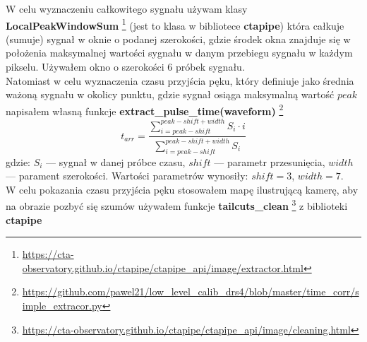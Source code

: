 \documentclass[a4paper,11pt,twoside]{article}
\begin{document}
W celu wyznaczeniu całkowitego sygnału używam klasy {\bf{LocalPeakWindowSum}} \footnote{\url{https://cta-observatory.github.io/ctapipe/ctapipe_api/image/extractor.html}} (jest to klasa w bibliotece {\bf{ctapipe}}) która całkuje (sumuje) sygnał w oknie o podanej szerokości, gdzie środek okna znajduje się w położenia maksymalnej wartości sygnału w danym przebiegu sygnału w każdym pikselu. Używałem okno o szerokości 6 próbek sygnału. \\ 
Natomiast w celu wyznaczenia czasu przyjścia pęku, który definiuje jako średnia ważoną sygnału w okolicy punktu, gdzie sygnał osiąga maksymalną wartość $peak$ napisałem własną funkcje {\bf{extract\_pulse\_time(waveform)}} \footnote{ \url{https://github.com/pawel21/low_level_calib_drs4/blob/master/time_corr/simple_extracor.py}}
\begin{equation}
t_{arr} = \frac{ \sum_{i=peak - shift}^{peak - shift + width} S_i \cdot i }{ \sum_{i=peak - shift}^{peak - shift + width} S_i}
\end{equation} 
gdzie: $S_i$ --- sygnał w danej próbce czasu, $shift$ --- parametr przesunięcia, $width$ --- parament szerokości. Wartości parametrów wynosiły: $shift = 3$, $width = 7$. \\
W celu pokazania czasu przyjścia pęku stosowałem mapę ilustrującą kamerę, aby na obrazie pozbyć się szumów używałem funkcje {\bf{tailcuts\_clean}} \footnote{ \url{https://cta-observatory.github.io/ctapipe/ctapipe_api/image/cleaning.html}} z biblioteki {\bf{ctapipe}}
\end{document}
